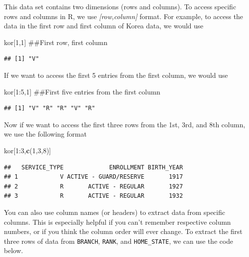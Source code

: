 \documentclass[]{book}
\newenvironment{Shaded}{\begin{snugshade}}{\end{snugshade}}
\newcommand{\KeywordTok}[1]{\textcolor[rgb]{0.13,0.29,0.53}{\textbf{{#1}}}}
\newcommand{\DecValTok}[1]{\textcolor[rgb]{0.00,0.00,0.81}{{#1}}}
\newcommand{\NormalTok}[1]{{#1}}
\begin{document}
This data set contains two dimensions (rows and columns). To access
specific rows and columns in R, we use \emph{{[}row,column{]}} format.
For example, to access the data in the first row and first column of
Korea data, we would use

\begin{Shaded}
\begin{Highlighting}[]
\NormalTok{kor[}\DecValTok{1}\NormalTok{,}\DecValTok{1}\NormalTok{]  ##First row, first column}
\end{Highlighting}
\end{Shaded}

\begin{verbatim}
## [1] "V"
\end{verbatim}

If we want to access the first 5 entries from the first column, we would
use

\begin{Shaded}
\begin{Highlighting}[]
\NormalTok{kor[}\DecValTok{1}\NormalTok{:}\DecValTok{5}\NormalTok{,}\DecValTok{1}\NormalTok{] ##First five entries from the first column}
\end{Highlighting}
\end{Shaded}

\begin{verbatim}
## [1] "V" "R" "R" "V" "R"
\end{verbatim}

Now if we want to access the first three rows from the 1st, 3rd, and 8th
column, we use the following format

\begin{Shaded}
\begin{Highlighting}[]
\NormalTok{kor[}\DecValTok{1}\NormalTok{:}\DecValTok{3}\NormalTok{,}\KeywordTok{c}\NormalTok{(}\DecValTok{1}\NormalTok{,}\DecValTok{3}\NormalTok{,}\DecValTok{8}\NormalTok{)]}
\end{Highlighting}
\end{Shaded}

\begin{verbatim}
##   SERVICE_TYPE             ENROLLMENT BIRTH_YEAR
## 1            V ACTIVE - GUARD/RESERVE       1917
## 2            R       ACTIVE - REGULAR       1927
## 3            R       ACTIVE - REGULAR       1932
\end{verbatim}

You can also use column names (or headers) to extract data from specific
columns. This is especially helpful if you can't remember respective
column numbers, or if you think the column order will ever change. To
extract the first three rows of data from \texttt{BRANCH},
\texttt{RANK}, and \texttt{HOME\_STATE}, we can use the code below.
\end{document}
